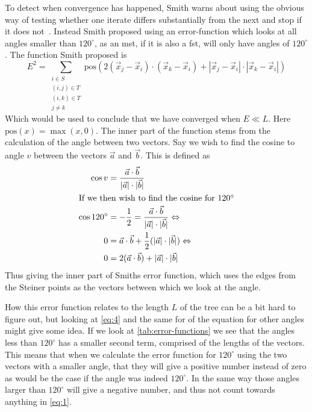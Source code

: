 To detect when convergence has happened, Smith warns about using the obvious way
of testing whether one iterate differs substantially from the next and stop if
it does not~\cite[p.~151]{Smith1992}.  Instead Smith proposed using an
error-function which looks at all angles smaller than $120^{\circ}$, as an
\gls{mst}, if it is also a \gls{fst}, will only have angles of $120^{\circ}$.
The function Smith proposed is
%
\begin{equation}
  \label{eq:1} E^2 = \sum_{
    \begin{array}{c} i \in S \\ (i,j) \in T \\ (i,k) \in T \\ j \ne k
    \end{array}} \text{pos} (2 (\vec x_j - \vec x_i) \cdot (\vec x_k - \vec x_i)
+ | \vec x_j - \vec x_i | \cdot | \vec x_k - \vec x_i |)
\end{equation}
%
Which would be used to conclude that we have converged when $E \ll L$.  Here
$\text{pos}(x) = \max(x, 0)$.  The inner part of the function stems from the
calculation of the angle between two vectors.  Say we wish to find the cosine to
angle $v$ between the vectors $\vec a$ and $\vec b$.  This is defined as
%
\begin{align} \cos v & = \frac{\vec a \cdot \vec b} {|\vec a| \cdot |\vec
b|} \label{eq:2} \\ \intertext{If we then wish to find the cosine for
$120^{\circ}$} \cos 120^{\circ} & = -\frac{1}{2} = \frac{\vec a \cdot \vec b}
{|\vec a| \cdot |\vec b|} \Leftrightarrow \label{eq:3} \\ 0 & = \vec a \cdot
\vec b + \frac{1}{2} (|\vec a| \cdot |\vec b|) \Leftrightarrow \label{eq:4} \\ 0
& = 2 (\vec a \cdot \vec b) + |\vec a| \cdot |\vec b| \label{eq:5}
\end{align}
%
Thus giving the inner part of Smiths error function, which uses the edges from
the Steiner points as the vectors between which we look at the angle.

How this error function relates to the length $L$ of the tree can be a bit hard
to figure out, but looking at \cref{eq:4} and the same for of the equation for
other angles might give some idea.  If we look at \cref{tab:error-functions} we
see that the angles less than $120^{\circ}$ has a smaller second term, comprised
of the lengths of the vectors.  This means that when we calculate the error
function for $120^{\circ}$ using the two vectors with a smaller angle, that they
will give a positive number instead of zero as would be the case if the angle
was indeed $120^{\circ}$.  In the same way those angles larger than
$120^{\circ}$ will give a negative number, and thus not count towards anything
in \cref{eq:1}.


